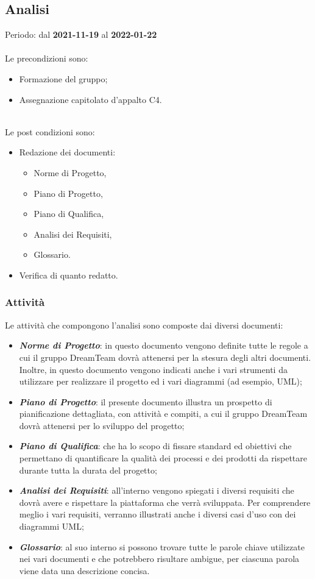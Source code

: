 
\subsection{Analisi} 
Periodo: dal \textbf{2021-11-19} al \textbf{2022-01-22}  \mbox{} \\ \mbox{} \\
Le precondizioni sono:
\begin{itemize}
\item Formazione del gruppo;
\item Assegnazione capitolato d’appalto C4.
\end{itemize}  \mbox{} \\
Le post condizioni sono:
\begin{itemize}
\item Redazione dei documenti:
\begin{itemize}
	\item Norme di Progetto,
	\item Piano di Progetto,
	\item Piano di Qualifica,
	\item Analisi dei Requisiti,
	\item Glossario.
\end{itemize}
\item Verifica di quanto redatto.
\end{itemize}

\subsubsection{Attività}

Le attività che compongono l’analisi sono composte dai diversi documenti:

\begin{itemize}
\item \textbf{\textit{Norme di Progetto}}: in questo documento vengono definite tutte le regole a cui il gruppo DreamTeam dovrà attenersi per la stesura degli altri documenti. Inoltre, in questo documento vengono indicati anche i vari strumenti da utilizzare per realizzare il progetto ed i vari diagrammi (ad esempio, UML);  
\item \textbf{\textit{Piano di Progetto}}: il presente documento illustra un prospetto di pianificazione dettagliata, con attività e compiti, a cui il gruppo DreamTeam dovrà attenersi per lo sviluppo del progetto;
\item \textbf{\textit{Piano di Qualifica}}: che ha lo scopo di fissare standard ed obiettivi che permettano di quantificare la qualità dei processi e dei prodotti da rispettare durante tutta la durata del progetto;
\item \textbf{\textit{Analisi dei Requisiti}}: all’interno vengono spiegati i diversi requisiti che dovrà avere e rispettare la piattaforma che verrà sviluppata. Per comprendere meglio i vari requisiti, verranno illustrati anche i diversi casi d’uso con dei diagrammi UML;
\item \textbf{\textit{Glossario}}: al suo interno si possono trovare tutte le parole chiave utilizzate nei vari documenti e che potrebbero risultare ambigue, per ciascuna parola viene data una descrizione concisa.
\end{itemize}

